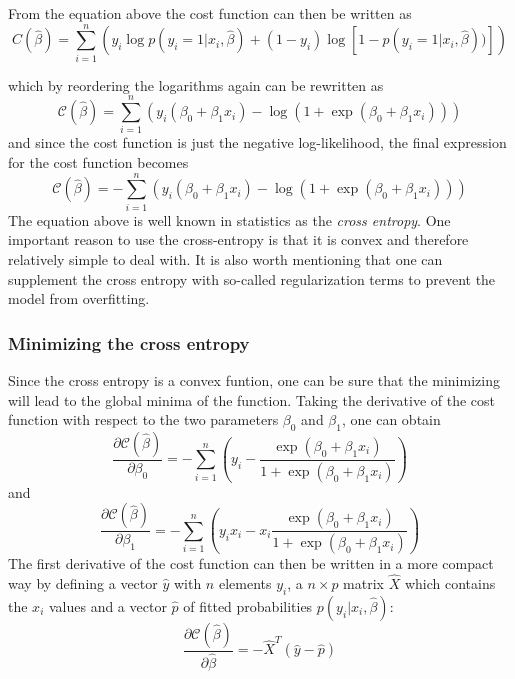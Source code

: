 \documentclass[a4paper,12pt]{article}
\begin{document}
 From the equation above the cost function can then be written as
 \begin{equation}
 C(\hat{\beta}) = \sum_{i=1}^n \left( y_i\log{p(y_i=1|x_i,\hat{\beta})} + (1-y_i)\log\left[1-p(y_i=1|x_i,\hat{\beta}))\right]\right)
 \end{equation}
 
 which by reordering the logarithms again can be rewritten as
 \begin{equation}
     \mathcal{C}(\hat{\beta}) = \sum_{i=1}^n  \left(y_i(\beta_0+\beta_1x_i) -\log{(1+\exp{(\beta_0+\beta_1x_i)})}\right)
 \end{equation}
 and since the cost function is just the negative log-likelihood, the final expression for the cost function becomes
 \begin{equation}
     \mathcal{C}(\hat{\beta}) = -\sum_{i=1}^n  \left(y_i(\beta_0+\beta_1x_i) -\log{(1+\exp{(\beta_0+\beta_1x_i)})}\right)
 \end{equation}
 The equation above is well known in statistics as the \emph{cross entropy}.\newline
 One important reason to use the cross-entropy is that it is convex and therefore relatively simple to deal with.
It is also worth mentioning that one can supplement the cross entropy with so-called regularization terms to prevent the model from overfitting.\newline

\subsubsection{Minimizing the cross entropy}
Since the cross entropy is a convex funtion, one can be sure that the minimizing will lead to the global minima of the function. Taking the derivative of the cost function with respect to the two parameters $\beta_0$ and $\beta_1$, one can obtain
\begin{equation*}
    \frac{\partial \mathcal{C}(\hat{\beta})}{\partial \beta_0} = -\sum_{i=1}^n  \left(y_i -\frac{\exp{(\beta_0+\beta_1x_i)}}{1+\exp{(\beta_0+\beta_1x_i)}}\right)
\end{equation*}
and
\begin{equation*}
    \frac{\partial \mathcal{C}(\hat{\beta})}{\partial \beta_1} = -\sum_{i=1}^n  \left(y_ix_i -x_i\frac{\exp{(\beta_0+\beta_1x_i)}}{1+\exp{(\beta_0+\beta_1x_i)}}\right)
\end{equation*}
The first derivative of the cost function can then be written in a more compact way by defining a vector $\hat{y}$ with $n$ elements $y_i$, a
$n\times p$ matrix $\hat{X}$ which contains the $x_i$ values and a
vector $\hat{p}$ of fitted probabilities $p(y_i\vert x_i,\hat{\beta})$:
\begin{equation}
    \frac{\partial \mathcal{C}(\hat{\beta})}{\partial \hat{\beta}} = -\hat{X}^T\left(\hat{y}-\hat{p}\right)
\end{equation}
\end{document}
